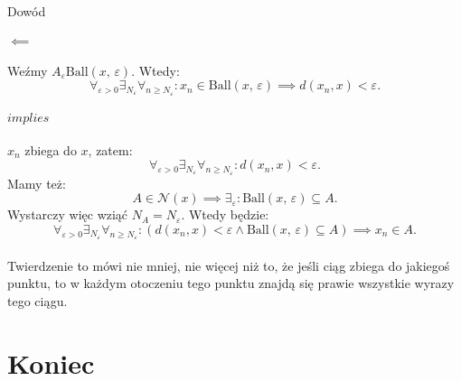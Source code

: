 \documentclass{article}
\newcommand{\eps}{\varepsilon}
\newcommand{\Nau}{\mathcal{N}}
\newcommand{\ball}[2]{\text{Ball}(#1, \, #2)}
\begin{document}
    \begin{dow}{Dowód}
        \paragraph{$\impliedby$} Weźmy $A_\eps  \ball{x}{\eps}$. Wtedy:\begin{equation}
            \forall_{\eps >0} \exists_{N_\eps} \forall_{n \geqslant N_\eps}: x_n \in \ball{x}{\eps} \implies d(x_n, x) < \eps.
        \end{equation}
        \paragraph{$implies$} $x_n$ zbiega do $x$, zatem: \begin{equation*}
            \forall_{\eps >0} \exists_{N_\eps} \forall_{n \geqslant N_\eps}: d(x_n, x) < \eps.
        \end{equation*} Mamy też: \begin{equation*}
            A \in \Nau(x) \implies \exists_\eps: \ball{x}{\eps} \subseteq A.
        \end{equation*} Wystarczy więc wziąć $N_A = N_\eps$. Wtedy będzie: \begin{equation}
            \forall_{\eps >0} \exists_{N_\eps} \forall_{n \geqslant N_\eps}: (d(x_n, x) < \eps \wedge \ball{x}{\eps} \subseteq A) \implies x_n \in A.
        \end{equation}
    \end{dow}

    \paragraph*{} Twierdzenie to mówi nie mniej, nie więcej niż to, że jeśli ciąg zbiega do jakiegoś punktu, to w każdym otoczeniu tego punktu znajdą się prawie wszystkie wyrazy tego ciągu.

\section*{Koniec}
\tableofcontents
\end{document}
